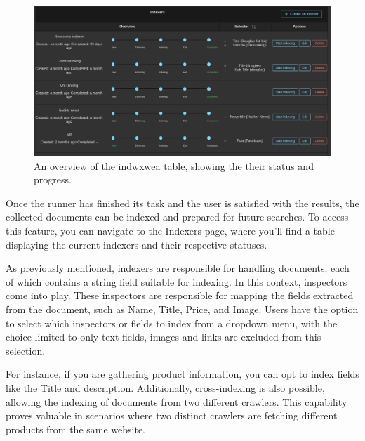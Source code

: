 \begin{figure}[h]	
     \centering
     \includegraphics[width=13cm]{images/demo-10.png}
     \caption{An overview of the indwxwea table, showing the their status and progress.}
     \label{fig:software-arch}
\end{figure}

Once the runner has finished its task and the user is satisfied with the results, the collected documents can be indexed and prepared for future searches. To access this feature, you can navigate to the Indexers page, where you'll find a table displaying the current indexers and their respective statuses.

As previously mentioned, indexers are responsible for handling documents, each of which contains a string field suitable for indexing. In this context, inspectors come into play. These inspectors are responsible for mapping the fields extracted from the document, such as Name, Title, Price, and Image. Users have the option to select which inspectors or fields to index from a dropdown menu, with the choice limited to only text fields, images and links are excluded from this selection.

For instance, if you are gathering product information, you can opt to index fields like the Title and description. Additionally, cross-indexing is also possible, allowing the indexing of documents from two different crawlers. This capability proves valuable in scenarios where two distinct crawlers are fetching different products from the same website.

